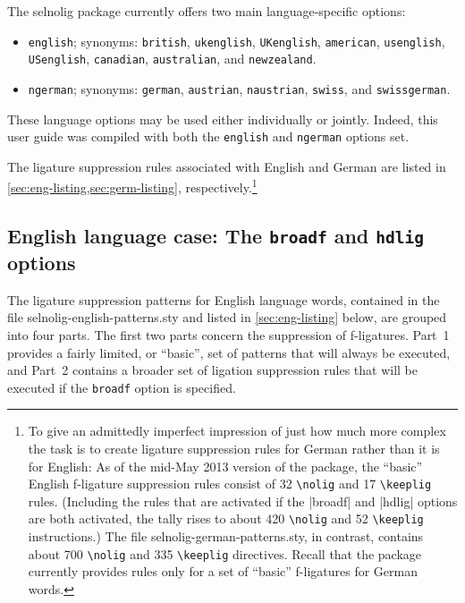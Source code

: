 \documentclass[11pt]{article}
\newcommand{\pkg}[1]{\textsf{#1}}
\newcommand{\opt}[1]{\texttt{#1}}
\newcommand{\cmmd}[1]{\texttt{\textbackslash #1}}
\begin{document}
The \pkg{selnolig} package currently offers two main language-specific options: 
\begin{itemize}
\item \opt{english}; synonyms: \opt{british}, \opt{ukenglish}, \opt{UKenglish}, \opt{amer\-ican}, \opt{usenglish}, \opt{USenglish}, \opt{cana\-dian}, \opt{australian}, and \opt{new\-zealand}.
\item \opt{ngerman}; synonyms: \opt{german}, \opt{austrian}, \opt{naustrian}, \opt{swiss}, and \opt{swiss\-german}.
\end{itemize}
These language options may be used either individually or jointly. Indeed, this user guide was compiled with both the \opt{english} and \opt{ngerman} options set.

The ligature suppression rules associated with English and German are listed in \cref{sec:eng-listing,sec:germ-listing}, respectively.\footnote{To give an admittedly imperfect impression of just how much more complex the task is to create ligature suppression rules for German rather than it is for English: As of the mid-May 2013 version of the package, the \enquote{basic} English f-ligature suppression rules consist of 32 \cmmd{nolig} and 17 \cmmd{keeplig} rules. (Including the rules that are activated if the |broadf| and |hdlig| options are both activated, the tally rises to about 420 \cmmd{nolig} and 52 \cmmd{keeplig} instructions.) The file \pkg{selnolig-german-patterns.sty}, in contrast, contains about 700 \cmmd{nolig} and 335 \cmmd{keeplig} directives. Recall that the package currently provides rules only for a set of \enquote{basic} f-ligatures for German words.}



\subsection[English language case: The broadf and hdlig options]{English language case: The \opt{broadf} and \opt{hdlig} options} \label{sec:eng-opt}

The ligature suppression patterns for English language words, contained in the file \pkg{selnolig-english-patterns.sty} and listed in \cref{sec:eng-listing} below, are grouped into four parts. The first two parts concern the suppression of f-ligatures. Part~1 provides a fairly limited, or \enquote{basic}, set of patterns that will always be executed, and Part~2 contains a broader set of ligation suppression rules that will be executed if the \opt{broadf} option is specified. 
\end{document}
